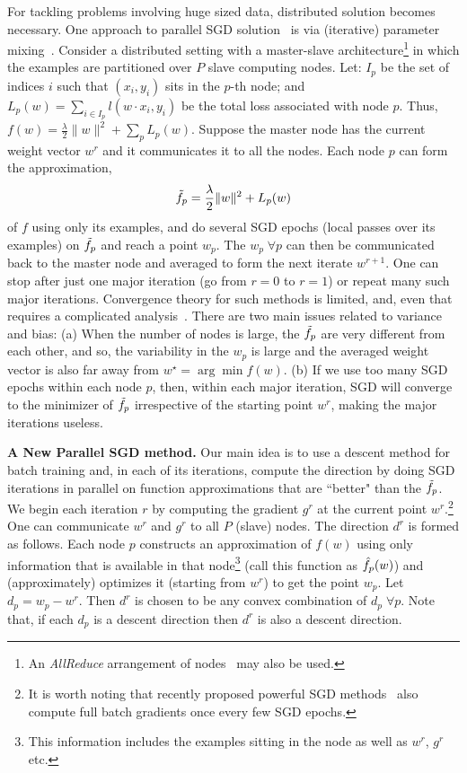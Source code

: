 \documentclass{article} %
\begin{document}
For tackling problems involving huge sized data, distributed solution becomes necessary. One approach to parallel SGD solution~\cite{zinkevich2010} is via (iterative) parameter mixing~\cite{mann2009,hall2010}. Consider a distributed setting with a master-slave architecture\footnote{An {\it AllReduce} arrangement of nodes~\cite{agarwal2011} may also be used.} in which the examples are partitioned over $P$ slave computing nodes. Let: $I_p$ be the set of indices $i$ such that $(x_i,y_i)$ sits in the $p$-th node; and $L_p(w) = \sum_{i\in I_p} l(w\cdot x_i,y_i)$ be the total loss associated with node $p$. Thus, $f(w)=\frac{\lambda}{2} \|w\|^2 + \sum_p L_p(w)$. Suppose the master node has the current weight vector $w^r$ and it communicates it to all the nodes. Each node $p$ can form the approximation,
\begin{equation}
\tilde{f}_p=\frac{\lambda}{2} \|w\|^2 + L_p(w)
\label{ftilde}
\end{equation}
of $f$ using only its examples, and do several SGD epochs (local passes over its examples) on $\tilde{f}_p$ and reach a point $w_p$. The $w_p\;\forall p$ can then be communicated back to the master node and averaged to form the next iterate $w^{r+1}$. One can stop after just one major iteration (go from $r=0$ to $r=1$) or repeat many such major iterations. Convergence theory for such methods is limited, and, even that requires a complicated analysis~\cite{zinkevich2010}. There are two main issues related to variance and bias: (a) When the number of nodes is large, the $\tilde{f}_p$ are very different from each other, and so, the variability in the $w_p$ is large and the averaged weight vector is also far away from $w^\star=\arg\min f(w)$. (b) If we use too many SGD epochs within each node $p$, then, within each major iteration, SGD will converge to the minimizer of $\tilde{f}_p$ irrespective of the starting point $w^r$, making the major iterations useless.

{\bf A New Parallel SGD method.}
Our main idea is to use a descent method for batch training and, in each of its iterations, compute the direction by doing SGD iterations in parallel on function approximations that are ``better" than the $\tilde{f}_p$. We begin each iteration $r$ by computing the gradient $g^r$ at the current point $w^r$.\footnote{It is worth noting that recently proposed powerful SGD methods~\cite{johnson2013} also compute full batch gradients once every few SGD epochs.} One can communicate $w^r$ and $g^r$ to all $P$ (slave) nodes. The direction $d^r$ is formed as follows. Each node $p$ constructs an approximation of $f(w)$ using only information that is available in that node\footnote{This information includes the examples sitting in the node as well as $w^r$, $g^r$ etc.} (call this function as $\hat{f}_p(w)$) and (approximately) optimizes it (starting from $w^r$) to get the point $w_p$. Let $d_p=w_p-w^r$. Then $d^r$ is chosen to be any convex combination of $d_p\;\forall p$. Note that, if each $d_p$ is a descent direction then $d^r$ is also a descent direction.
\end{document}
